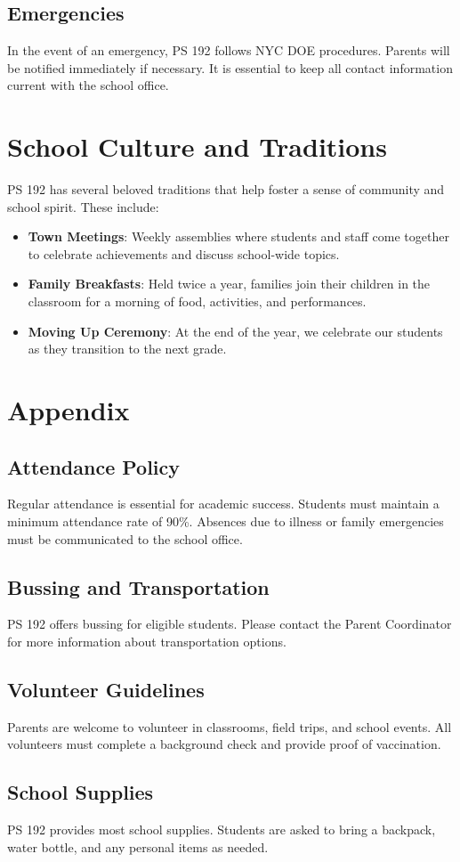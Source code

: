 \documentclass[11pt]{article}
\begin{document}
\subsection{Emergencies}
\label{sec:org06f87cd}
In the event of an emergency, PS 192 follows NYC DOE procedures. Parents will be notified immediately if necessary. It is essential to keep all contact information current with the school office.

\section{School Culture and Traditions}
\label{sec:org69b2f07}
PS 192 has several beloved traditions that help foster a sense of community and school spirit. These include:

\begin{itemize}
\item \textbf{\textbf{Town Meetings}}: Weekly assemblies where students and staff come together to celebrate achievements and discuss school-wide topics.
\item \textbf{\textbf{Family Breakfasts}}: Held twice a year, families join their children in the classroom for a morning of food, activities, and performances.
\item \textbf{\textbf{Moving Up Ceremony}}: At the end of the year, we celebrate our students as they transition to the next grade.
\end{itemize}

\section{Appendix}
\label{sec:org114fee7}
\subsection{Attendance Policy}
\label{sec:org1eb4489}
Regular attendance is essential for academic success. Students must maintain a minimum attendance rate of 90\%. Absences due to illness or family emergencies must be communicated to the school office.

\subsection{Bussing and Transportation}
\label{sec:org4286a55}
PS 192 offers bussing for eligible students. Please contact the Parent Coordinator for more information about transportation options.

\subsection{Volunteer Guidelines}
\label{sec:orgf2e46df}
Parents are welcome to volunteer in classrooms, field trips, and school events. All volunteers must complete a background check and provide proof of vaccination.

\subsection{School Supplies}
\label{sec:org50b69b3}
PS 192 provides most school supplies. Students are asked to bring a backpack, water bottle, and any personal items as needed.
\end{document}
